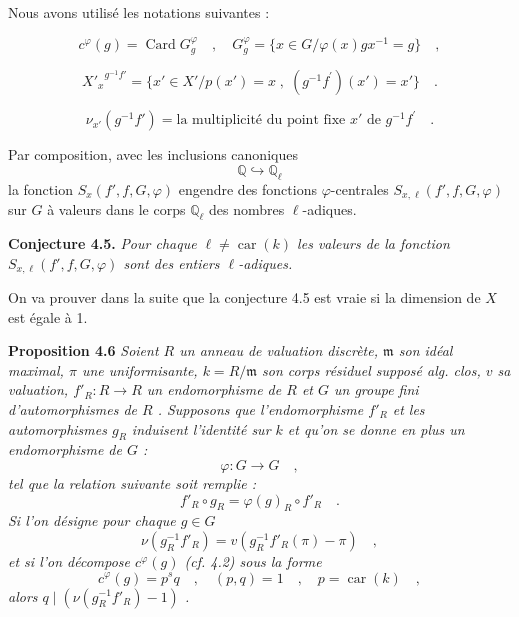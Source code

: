 \documentclass[11pt]{article}
\providecommand{\fm}{\mathfrak{m}}
\newcommand{\car}{\operatorname{car}}
\providecommand{\car}{\operatorname{car}}
\providecommand{\car}{\operatorname{car}}
\providecommand{\bQ}{\mathbb Q}
\providecommand{\fm}{\mathfrak m}
\providecommand{\car}{\operatorname{car}}
\begin{document}
Nous avons utilisé les notations suivantes :

\begin{equation}\tag{4.2}
c^\varphi(g) = \operatorname{Card} G_g^\varphi \quad , \quad G_g^\varphi = \{ x \in G / \varphi(x)gx^{-1} = g \} \quad ,
\end{equation}

\begin{equation}\tag{4.3}
{X'_x}^{g^{-1}f'} = \{ x' \in X' / p(x') = x \; , \; (g^{-1}f^{\prime})(x') = x' \} \quad .
\end{equation}

\begin{equation}\tag{4.4}
\nu_{x'}(g^{-1}f') = \text{la multiplicité du point fixe } x' \text{ de } g^{-1}f^{\prime} \quad .
\end{equation}

Par composition, avec les inclusions canoniques
\[
\bQ \hookrightarrow \bQ_\ell
\]
la
fonction $S_x(f',f,G,\varphi)$ engendre des fonctions $\varphi$-centrales $S_{x,\ell}(f',f,G,\varphi)$ sur $G$ à valeurs dans le corps $\bQ_\ell$ des nombres $\ell$-adiques.

\medskip
\noindent
\textbf{Conjecture 4.5.} \emph{Pour chaque $\ell \neq \car(k)$ les valeurs de la fonction $S_{x,\ell}(f',f,G,\varphi)$ sont des entiers $\ell$-adiques.}

\medskip

On va prouver dans la suite que la conjecture 4.5 est vraie si la dimension de $X$ est égale à 1.

\medskip
\noindent
\textbf{Proposition 4.6} \emph{Soient $R$ un anneau de valuation discrète, $\fm$ son idéal maximal, $\pi$ une uniformisante, $k = R/\fm$ son corps résiduel supposé alg. clos, $v$ sa valuation, $f'_R : R \to R$ un endomorphisme de $R$ et $G$ un groupe fini d'automorphismes de $R$ . Supposons que l'endomorphisme $f'_R$ et les automorphismes $g_R$ induisent l'identité sur $k$ et qu'on se donne en plus un endomorphisme de $G$ :
\[
\varphi : G \longrightarrow G \quad ,
\]
tel que la relation suivante soit remplie :
\[
f'_R \circ g_R = \varphi(g)_R \circ f'_R \quad .
\]
Si l'on désigne pour chaque $g \in G$
\[
\nu(g_R^{-1}f'_R) = v(g_R^{-1}f'_R(\pi) - \pi) \quad ,
\]
et si l'on décompose $c^\varphi(g)$ (cf. 4.2) sous la forme
\[
c^\varphi(g) = p^s q \quad , \quad (p,q) = 1 \quad , \quad p = \car(k) \quad ,
\]
alors $q \mid (\nu(g_R^{-1}f'_R) - 1)$ .}
\end{document}
